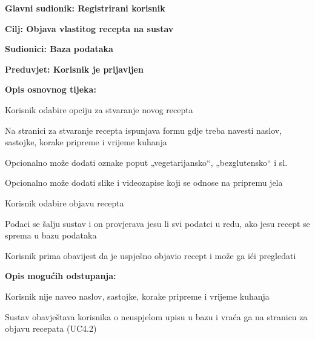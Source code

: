 				
				
				\noindent {}
				\begin{packed_item}
					
					\item \textbf{Glavni sudionik: Registrirani korisnik }
					\item  \textbf{Cilj: Objava vlastitog recepta na sustav} 
					\item  \textbf{Sudionici: Baza podataka} 
					\item  \textbf{Preduvjet: Korisnik je prijavljen} 
					\item  \textbf{Opis osnovnog tijeka:}
					
					\item[] \begin{packed_enum}
						
						\item Korisnik odabire opciju za stvaranje novog recepta
						\item Na stranici za stvaranje recepta ispunjava formu gdje treba navesti naslov, sastojke, korake pripreme i vrijeme kuhanja
						\item Opcionalno može dodati oznake poput „vegetarijansko“, „bezglutensko“ i sl.
						\item Opcionalno može dodati slike i videozapise koji se odnose na pripremu jela
						\item Korisnik odabire objavu recepta
						\item Podaci se šalju sustav i on provjerava jesu li svi podatci u redu, ako jesu recept se sprema u bazu podataka 
						\item Korisnik prima obavijest da je uspješno objavio recept i može ga ići pregledati
						
					\end{packed_enum}
					
					\item  \textbf{Opis mogućih odstupanja:}
					
					\item[] \begin{packed_item}
						
						\item[2.a] Korisnik nije naveo naslov, sastojke, korake pripreme i vrijeme kuhanja
						\item[] \begin{packed_enum}
							
							\item Sustav obavještava korisnika o neuspjelom upisu u bazu i vraća ga na stranicu za objavu recepata (UC4.2)
							
						\end{packed_enum}
						
					\end{packed_item}
				\end{packed_item}
				

